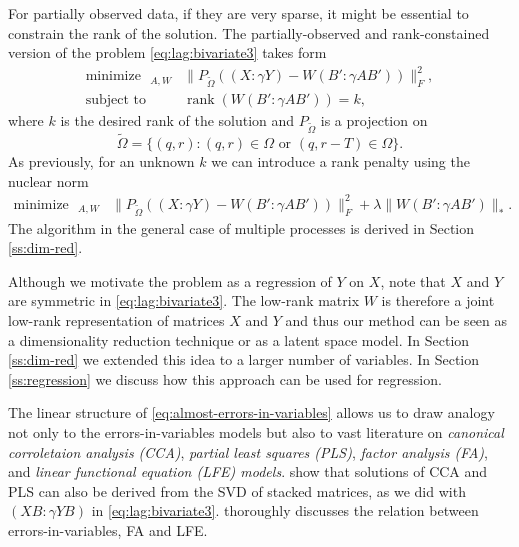 \documentclass[preprint]{imsart}
\numberwithin{equation}{section}
\theoremstyle{plain}
\DeclareMathOperator*{\rank}{rank}
\DeclareMathOperator*{\minimize}{minimize\ \ }
\DeclareMathOperator*{\subjectto}{subject\ to\ \ }
\begin{document}
For partially observed data, if they are very sparse, it might be essential to constrain the rank of the solution. The partially-observed and rank-constained version of the problem \eqref{eq:lag:bivariate3} takes form 
\begin{align*}%
  \minimize_{A,W} & \| P_{\tilde\Omega}((X:\gamma Y) - W(B':\gamma A B')) \|_F^2,\nonumber\\
  \subjectto & \rank(W(B':\gamma A B')) = k,
\end{align*}
where $k$ is the desired rank of the solution and $P_{\tilde\Omega}$ is a projection on \[\tilde\Omega = \{(q,r): (q,r) \in \Omega \text{ or } (q,r-T) \in \Omega\}. \] As previously, for an unknown $k$ we can introduce a rank penalty using the nuclear norm
\begin{align}\label{eq:lag:bivariate2-partial}
  \minimize_{A,W} & \| P_{\tilde\Omega}((X:\gamma Y) - W(B':\gamma A B')) \|_F^2 + \lambda\|W(B':\gamma A B')\|_*.
\end{align}
The algorithm in the general case of multiple processes is derived in Section \ref{ss:dim-red}.

Although we motivate the problem as a regression of $Y$ on $X$, note that $X$ and $Y$ are symmetric in \eqref{eq:lag:bivariate3}. The low-rank matrix $W$ is therefore a joint low-rank representation of matrices $X$ and $Y$ and thus our method can be seen as a dimensionality reduction technique or as a latent space model. In Section \ref{ss:dim-red} we extended this idea to a larger number of variables. In Section \ref{ss:regression} we discuss how this approach can be used for regression.

The linear structure of \eqref{eq:almost-errors-in-variables} allows us to draw analogy not only to the errors-in-variables models but also to vast literature on {\em canonical corroletaion analysis (CCA)}, {\em partial least squares (PLS)}, {\em factor analysis (FA)}, and {\em linear functional equation (LFE) models}. \cite{borga1997unified} show that solutions of CCA and PLS can also be derived from the SVD of stacked matrices, as we did with $(XB:\gamma YB)$ in \eqref{eq:lag:bivariate3}. \cite{gleser1981estimation} thoroughly discusses the relation between errors-in-variables, FA and LFE.

\end{document}
